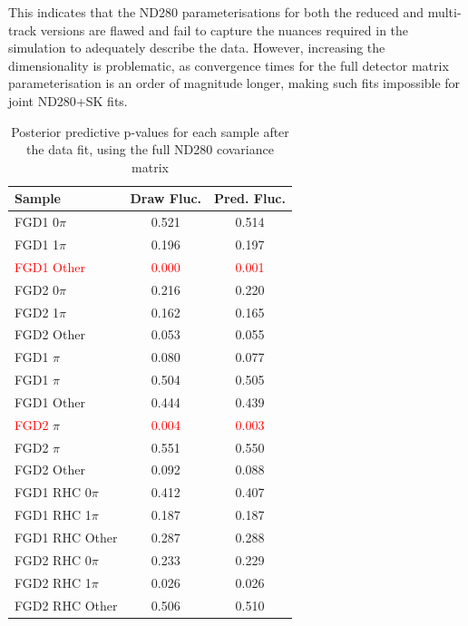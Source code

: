 This indicates that the ND280 parameterisations for both the reduced and multi-track versions are flawed and fail to capture the nuances required in the simulation to adequately describe the data. However, increasing the dimensionality is problematic, as convergence times for the full detector matrix parameterisation is an order of magnitude longer, making such fits impossible for joint ND280+SK fits. 
\begin{table}[h]
	\centering
	\begin{tabular}{l | c c }
		\hline \hline
		Sample & Draw Fluc. & Pred. Fluc. \\
		\hline
		FGD1 0$\pi$ & 0.521 & 0.514 \\
		FGD1 1$\pi$ & 0.196 & 0.197 \\
		\textcolor{red}{FGD1 Other}  & \textcolor{red}{0.000} & \textcolor{red}{0.001} \\
		\hline
		FGD2 0$\pi$ & 0.216 & 0.220 \\
		FGD2 1$\pi$ & 0.162 & 0.165 \\
		FGD2 Other  & 0.053 & 0.055 \\
		\hline
		FGD1 \numubar 0$\pi$ & 0.080 & 0.077 \\
		FGD1 \numubar 1$\pi$ & 0.504 & 0.505 \\
		FGD1 \numubar Other  & 0.444 & 0.439 \\
		\hline
		\textcolor{red}{FGD2} \numubar 0$\pi$ & \textcolor{red}{0.004} & \textcolor{red}{0.003} \\
		FGD2 \numubar 1$\pi$ & 0.551 & 0.550 \\
		FGD2 \numubar Other  & 0.092 & 0.088 \\
		\hline
		FGD1 \numu RHC 0$\pi$ & 0.412 & 0.407 \\
		FGD1 \numu RHC 1$\pi$ & 0.187 & 0.187 \\
		FGD1 \numu RHC Other  & 0.287 & 0.288 \\
		\hline
		FGD2 \numu RHC 0$\pi$ & 0.233 & 0.229 \\
		FGD2 \numu RHC 1$\pi$ & 0.026 & 0.026 \\
		FGD2 \numu RHC Other  & 0.506 & 0.510 \\
		\hline
		\hline
	\end{tabular}
	\caption{Posterior predictive p-values for each sample after the data fit, using the full ND280 covariance matrix}
	\label{tab:data_post_pvalue_fullcov_2018}
\end{table}

